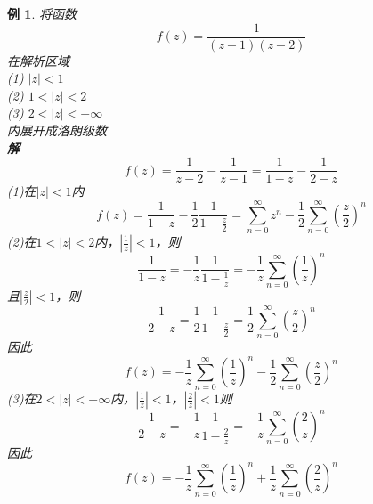 \documentclass[12pt, a4paper, twoside]{ctexbook}
\newtheorem{example}[theorem]{例}
\begin{document}
\begin{example}
	将函数
	$$
	f\left(z\right)=\frac{1}{\left(z-1\right)\left(z-2\right)}
	$$
	\hspace*{2em}在解析区域\\
	\hspace*{2em}(1) $\left|z\right|<1$\\
	\hspace*{2em}(2) $1<\left|z\right|<2$\\
	\hspace*{2em}(3) $2<\left|z\right|<+\infty$\\
	\hspace*{2em}内展开成洛朗级数\\
	\hspace*{1em}\textbf{解}
	$$
	f\left(z\right)=\frac{1}{z-2}-\frac{1}{z-1}=\frac{1}{1-z}-\frac{1}{2-z}
	$$
	\hspace*{2em}(1)在$\left|z\right|<1$内
	$$
	f\left(z\right)=\frac{1}{1-z}-\frac{1}{2}\frac{1}{1-\frac{z}{2}}=\sum_{n=0}^{\infty}z^n-\frac{1}{2}\sum_{n=0}^{\infty}\left(\frac{z}{2}\right)^n
	$$
	\newpage
	(2)在$1<\left|z\right|<2$内，$\left|\frac{1}{z}\right|<1$，则
	$$
	\frac{1}{1-z}=-\frac{1}{z}\frac{1}{1-\frac{1}{z}}=-\frac{1}{z}\sum_{n=0}^{\infty}\left(\frac{1}{z}\right)^n
	$$
	\hspace*{2em}且$\left|\frac{z}{2}\right|<1$，则
	$$
	\frac{1}{2-z}=\frac{1}{2}\frac{1}{1-\frac{z}{2}}=\frac{1}{2}\sum_{n=0}^{\infty}\left(\frac{z}{2}\right)^n
	$$
	\hspace*{2em}因此
	$$
	f\left(z\right)=-\frac{1}{z}\sum_{n=0}^{\infty}\left(\frac{1}{z}\right)^n-\frac{1}{2}\sum_{n=0}^{\infty}\left(\frac{z}{2}\right)^n
	$$
	\hspace*{2em}(3)在$2<\left|z\right|<+\infty$内，$\left|\frac{1}{z}\right|<1$，$\left|\frac{2}{z}\right|<1$则
	$$
	\frac{1}{2-z}=-\frac{1}{z}\frac{1}{1-\frac{2}{z}}=-\frac{1}{z}\sum_{n=0}^{\infty}\left(\frac{2}{z}\right)^n
	$$
	\hspace*{2em}因此
	$$
	f\left(z\right)=-\frac{1}{z}\sum_{n=0}^{\infty}\left(\frac{1}{z}\right)^n+\frac{1}{z}\sum_{n=0}^{\infty}\left(\frac{2}{z}\right)^n
	$$
\end{example}
\end{document}
